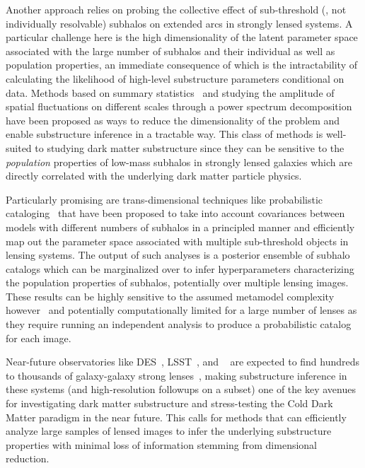 \documentclass[twocolumn]{aastex62}
\begin{document}
Another approach relies on probing the collective effect of sub-threshold (\ie, not individually resolvable) subhalos on extended arcs in strongly lensed systems. A particular challenge here is the high dimensionality of the latent parameter space associated with the large number of subhalos and their individual as well as population properties, an immediate consequence of which is the intractability of calculating the likelihood of high-level substructure parameters conditional on data. Methods based on summary statistics~\citep{1702.00009} and studying the amplitude of spatial fluctuations on different scales through a power spectrum decomposition~\citep{1403.2720,1809.00004,1707.04590,1806.07897,1808.03501,1710.03075,1506.01724} have been proposed as ways to reduce the dimensionality of the problem and enable substructure inference in a tractable way. This class of methods is well-suited to studying dark matter substructure since they can be sensitive to the \emph{population} properties of low-mass subhalos in strongly lensed galaxies which are directly correlated with the underlying dark matter particle physics. 

Particularly promising are trans-dimensional techniques like probabilistic cataloging~\citep{1508.00662,1706.06111} that have been proposed to take into account covariances between models with different numbers of subhalos in a principled manner and efficiently map out the parameter space associated with multiple sub-threshold objects in lensing systems. The output of such analyses is a posterior ensemble of subhalo catalogs which can be marginalized over to infer hyperparameters characterizing the population properties of subhalos, potentially over multiple lensing images. These results can be highly sensitive to the assumed metamodel complexity however~\citep{1706.06111} and potentially computationally limited for a large number of lenses as they require running an independent analysis to produce a probabilistic catalog for each image.

Near-future observatories like DES~\citep{1601.00329}, LSST~\citep{0912.0201,2019arXiv190201055D,1902.05141}, and \Euclid~\citep{1001.0061} are expected to find hundreds to thousands of galaxy-galaxy strong lenses~\citep{2015ApJ...811...20C,1001.2037,1003.5567}, making substructure inference in these systems (and high-resolution followups on a subset) one of the key avenues for investigating dark matter substructure and stress-testing the Cold Dark Matter paradigm in the near future. This calls for methods that can efficiently analyze large samples of lensed images to infer the underlying substructure properties with minimal loss of information stemming from dimensional reduction.
\end{document}
